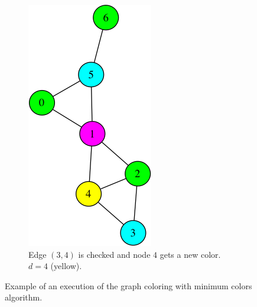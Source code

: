 \begin{figure}
\begin{subfigure}{0.20\textwidth}
\end{subfigure}
\hspace*{2cm} %
\begin{subfigure}{0.20\textwidth}
\includegraphics[width=\linewidth]{images/coloring/6.png}
\caption{Edge $(3,4)$ is checked and node $4$ gets a new color. $d=4$ (yellow).} \label{fig:coloring6}
\end{subfigure}

\caption{Example of an execution of the graph coloring with minimum colors algorithm.}\label{fig:coloring}
\end{figure}

